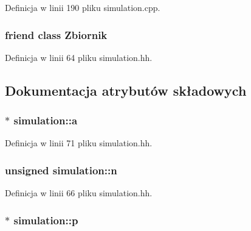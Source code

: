 Definicja w linii 190 pliku simulation.\+cpp.

\hypertarget{classsimulation_a444a8643309d19294860a4ae144137fe}{}
\subsubsection[{Zbiornik}]{\setlength{\rightskip}{0pt plus 5cm}friend class {\bf Zbiornik}\hspace{0.3cm}{\ttfamily [friend]}}\label{classsimulation_a444a8643309d19294860a4ae144137fe}


Definicja w linii 64 pliku simulation.\+hh.



\subsection{Dokumentacja atrybutów składowych}
\hypertarget{classsimulation_a7b5ca0e5fc096989be7966a73c360b7f}{}
\subsubsection[{a}]{$\ast$ simulation\+::a\hspace{0.3cm}{\ttfamily [private]}}\label{classsimulation_a7b5ca0e5fc096989be7966a73c360b7f}


Definicja w linii 71 pliku simulation.\+hh.

\hypertarget{classsimulation_a22eb97765a5c60adf3d995f7a110da70}{}
\subsubsection[{n}]{\setlength{\rightskip}{0pt plus 5cm}unsigned simulation\+::n\hspace{0.3cm}{\ttfamily [private]}}\label{classsimulation_a22eb97765a5c60adf3d995f7a110da70}


Definicja w linii 66 pliku simulation.\+hh.

\hypertarget{classsimulation_a5412fd01febe99f12ae38e30eb692ff0}{}
\subsubsection[{p}]{$\ast$ simulation\+::p\hspace{0.3cm}{\ttfamily [private]}}\label{classsimulation_a5412fd01febe99f12ae38e30eb692ff0}


